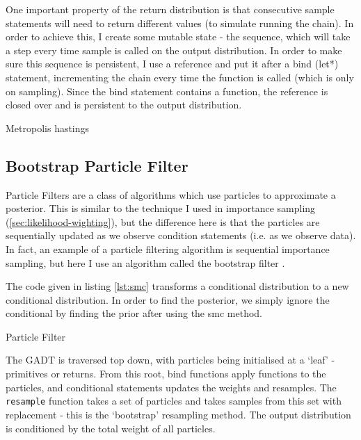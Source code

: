 One important property of the return distribution is that consecutive sample statements will need to return different values (to simulate running the chain). In order to achieve this, I create some mutable state - the sequence, which will take a step every time sample is called on the output distribution. In order to make sure this sequence is persistent, I use a reference and put it after a bind (let*) statement, incrementing the chain every time the function is called (which is only on sampling). Since the bind statement contains a function, the reference is closed over and is persistent to the output distribution.
	
\begin{listing}[!htb]
	\centering
	\caption{Metropolis hastings}
	\label{lst:mh}
\end{listing}
	
\subsection{Bootstrap Particle Filter} \label{sec:pf}
Particle Filters are a class of algorithms which use particles to approximate a posterior. This is similar to the technique I used in importance sampling (\ref{sec:likelihood-wighting}), but the difference here is that the particles are sequentially updated as we observe condition statements (i.e. as we observe data). In fact, an example of a particle filtering algorithm is sequential importance sampling, but here I use an algorithm called the bootstrap filter \cite{particlefilter}.
	
The code given in listing \ref{lst:smc} transforms a conditional distribution to a new conditional distribution. In order to find the posterior, we simply ignore the conditional by finding the prior after using the smc method.
	
\begin{listing}[!htb]
	\centering
	\caption{Particle Filter}
	\label{lst:smc}
\end{listing}
	
The GADT is traversed top down, with particles being initialised at a `leaf' - primitives or returns. From this root, bind functions apply functions to the particles, and conditional statements updates the weights and resamples. The \texttt{resample} function takes a set of particles and takes samples from this set with replacement - this is the `bootstrap' resampling method. The output distribution is conditioned by the total weight of all particles.
	

